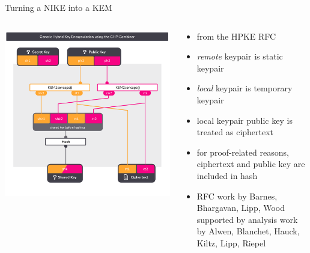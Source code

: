 \begin{frame}{Turning a NIKE into a KEM}
  \begin{columns}[c]
    \begin{column}{.55\linewidth}
    \includegraphics[width=\linewidth,page=2,clip=true,trim={29 43  29 58}]{graphics/rosenpass-encapsulation-combiner.pdf}
    \end{column}%
    \begin{column}{.45\linewidth}
      \small
      \begin{itemize}
        \item from the HPKE RFC \citeHpke
        \item \emph{remote} keypair is static keypair
        \item \emph{local} keypair is temporary keypair
        \item local keypair public key is treated as ciphertext
        \item for proof-related reasons, ciphertext and public key
          are included in hash
        \item RFC work by Barnes, Bhargavan, Lipp, Wood supported by
          analysis work by Alwen, Blanchet, Hauck, Kiltz, Lipp, Riepel
      \end{itemize}
    \end{column}
  \end{columns}
\end{frame}

